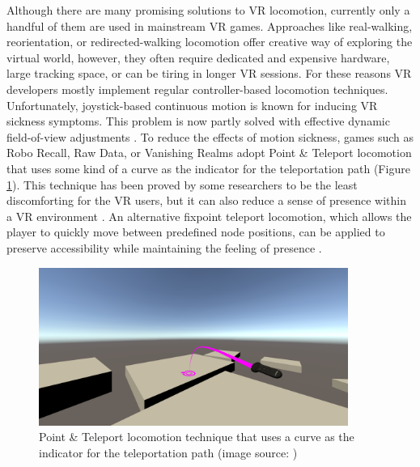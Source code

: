 Although there are many promising solutions to VR locomotion, currently only a handful of them are used in mainstream VR games. Approaches like real-walking, reorientation, or redirected-walking locomotion offer creative way of exploring the virtual world, however, they often require dedicated and expensive hardware, large tracking space, or can be tiring in longer VR sessions. For these reasons VR developers mostly implement regular controller-based locomotion techniques. Unfortunately, joystick-based continuous motion is known for inducing VR sickness symptoms. This problem is now partly solved with effective dynamic field-of-view adjustments \cite{DYNAMICFOD}. To reduce the effects of motion sickness, games such as Robo Recall, Raw Data, or Vanishing Realms adopt Point \& Teleport locomotion \cite{TELEPORTATIONGAMES} that uses some kind of a curve as the indicator for the teleportation path (Figure \ref{fig:TELEPORTATIONCURVEIMAGE}). This technique has been proved by some researchers to be the least discomforting for the VR users, but it can also reduce a sense of presence within a VR environment \cite{TELEPORTATIONEFFECTS}. An alternative fixpoint teleport locomotion, which allows the player to quickly move between predefined node positions, can be applied to preserve accessibility while maintaining the feeling of presence \cite{NODEBASEDTELEPORTATION}.

\begin{figure}[th]
\centering
\includegraphics[width=0.9\textwidth]{img/teleportation_curve.png}
\caption{Point \& Teleport locomotion technique that uses a curve as the indicator for the teleportation path (image source: \cite{TELEPORTATIONCURVE})}
\label{fig:TELEPORTATIONCURVEIMAGE}
\end{figure}


